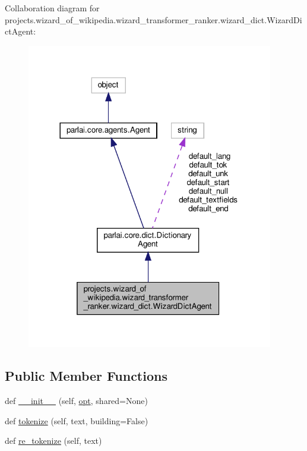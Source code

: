 Collaboration diagram for projects.\+wizard\+\_\+of\+\_\+wikipedia.\+wizard\+\_\+transformer\+\_\+ranker.\+wizard\+\_\+dict.\+Wizard\+Dict\+Agent\+:
\nopagebreak
\begin{figure}[H]
\begin{center}
\leavevmode
\includegraphics[width=305pt]{classprojects_1_1wizard__of__wikipedia_1_1wizard__transformer__ranker_1_1wizard__dict_1_1WizardDictAgent__coll__graph}
\end{center}
\end{figure}
\subsection*{Public Member Functions}
\begin{DoxyCompactItemize}
\item 
def \hyperlink{classprojects_1_1wizard__of__wikipedia_1_1wizard__transformer__ranker_1_1wizard__dict_1_1WizardDictAgent_abe32022c2dd77bd34b1185c81f512940}{\+\_\+\+\_\+init\+\_\+\+\_\+} (self, \hyperlink{classprojects_1_1wizard__of__wikipedia_1_1wizard__transformer__ranker_1_1wizard__dict_1_1WizardDictAgent_a831fb6427bb524c6ffdb0ceb287f53ae}{opt}, shared=None)
\item 
def \hyperlink{classprojects_1_1wizard__of__wikipedia_1_1wizard__transformer__ranker_1_1wizard__dict_1_1WizardDictAgent_a314852ee65380b494e078d51d73c0767}{tokenize} (self, text, building=False)
\item 
def \hyperlink{classprojects_1_1wizard__of__wikipedia_1_1wizard__transformer__ranker_1_1wizard__dict_1_1WizardDictAgent_ae65c7bad18faeb4fa72fb2448e123a33}{re\+\_\+tokenize} (self, text)
\end{DoxyCompactItemize}
